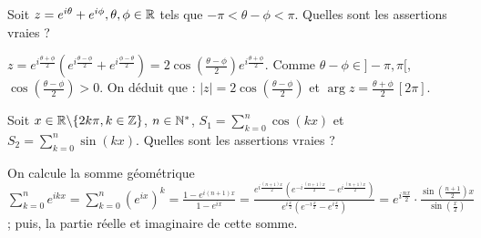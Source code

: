 \begin{question} 

Soit $z=e^{i\theta} + e^{i\phi} ,\theta, \phi \in \mathbb{R}$ tels que $-\pi < \theta - \phi < \pi$. Quelles sont les assertions vraies ?
\begin{answers}
    
    


\end{answers}
\begin{explanations}
$ z=e^{i\frac{\theta+\phi}{2}} (e^{i\frac{\theta-\phi}{2}} + e^{i\frac{\phi - \theta}{2}}) = 2 \cos (\frac{\theta-\phi}{2}) e^{i\frac{\theta+\phi}{2}}$. Comme $\theta-\phi \in ]-\pi,\pi[$,   $\cos (\frac{\theta-\phi}{2})>0$. On déduit que : $|z|=2\cos (\frac{\theta-\phi}{2})$ et $\arg z =  \frac{\theta+\phi}{2} \, [2\pi]$.
\end{explanations}

\end{question}






\begin{question} 

Soit $x\in \mathbb{R}\backslash \{2k\pi, k \in \mathbb{Z}\}$, $n \in \mathbb{N}^*$, 
$S_1= \sum_{k=0}^{n} \cos(kx)$ et $S_2= \sum_{k=0}^{n} \sin(kx)$. Quelles sont les assertions vraies ?
\begin{answers}
    
    
    
    
    
    

\end{answers}
\begin{explanations}
On calcule la somme géométrique $\sum_{k=0}^{n} e^{ikx}= \sum_{k=0}^{n} (e^{ix})^k = \frac{1-e^{i(n+1)x}}{1-e^{ix}}=\frac{e^{i\frac{(n+1)x}{2}}(e^{-i\frac{(n+1)x}{2}}-e^{i\frac{(n+1)x}{2}})}{e^{i\frac{x}{2}}(e^{-i\frac{x}{2}}-e^{i\frac{x}{2}})}= e^{i\frac{nx}{2}}\cdot  \frac{\sin (\frac{n+1}{2})x}{\sin (\frac{x}{2})}$; puis, la partie réelle
et imaginaire de cette somme.
\end{explanations}

\end{question}

